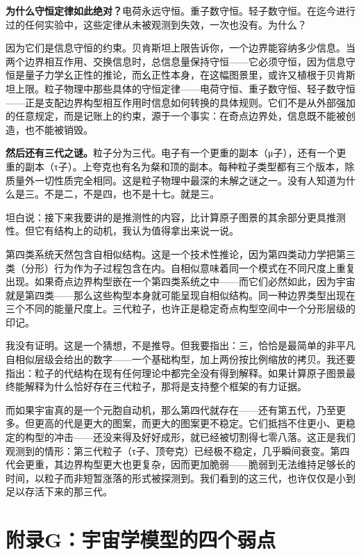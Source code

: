 \documentclass[11pt, twoside, openright]{book}
\begin{document}
\textbf{为什么守恒定律如此绝对？}电荷永远守恒。重子数守恒。轻子数守恒。在迄今进行过的任何实验中，这些定律从未被观测到失效，一次也没有。为什么？

因为它们是信息守恒的约束。贝肯斯坦上限告诉你，一个边界能容纳多少信息。当两个边界相互作用、交换信息时，总信息量保持守恒------它必须守恒，因为信息守恒是量子力学幺正性的推论，而幺正性本身，在这幅图景里，或许又植根于贝肯斯坦上限。粒子物理中那些具体的守恒定律------电荷守恒、重子数守恒、轻子数守恒------正是支配边界构型相互作用时信息如何转换的具体规则。它们不是从外部强加的任意规定，而是记账上的约束，源于一个事实：在奇点边界处，信息既不能被创造，也不能被销毁。

\textbf{然后还有三代之谜。}粒子分为三代。电子有一个更重的副本（μ子），还有一个更重的副本（τ子）。上夸克也有名为粲和顶的副本。每种粒子类型都有三个版本，除质量外一切性质完全相同。这是粒子物理中最深的未解之谜之一。没有人知道为什么是三。不是二，不是四，也不是十七。就是三。

坦白说：接下来我要讲的是推测性的内容，比计算原子图景的其余部分更具推测性。但它有结构上的动机，我认为值得拿出来说一说。

第四类系统天然包含自相似结构。这是一个技术性推论，因为第四类动力学把第三类（分形）行为作为子过程包含在内。自相似意味着同一个模式在不同尺度上重复出现。如果奇点边界构型嵌在一个第四类系统之中------而它们必然如此，因为宇宙就是第四类------那么这些构型本身就可能呈现自相似结构。同一种边界类型出现在三个不同的能量尺度上。三代粒子，也许正是稳定奇点构型空间中一个分形层级的印记。

我没有证明。这是一个猜想，不是推导。但我要指出：三，恰恰是最简单的非平凡自相似层级会给出的数字------一个基础构型，加上两份按比例缩放的拷贝。我还要指出：粒子的代结构在现有任何理论中都完全没有得到解释。如果计算原子图景最终能解释为什么恰好存在三代粒子，那将是支持整个框架的有力证据。

而如果宇宙真的是一个元胞自动机，那么第四代就存在------还有第五代，乃至更多。但更高的代是更大的图案，而更大的图案更不稳定。它们抵挡不住更小、更稳定的构型的冲击------还没来得及好好成形，就已经被切割得七零八落。这正是我们观测到的情形：第三代粒子（τ子、顶夸克）已经极不稳定，几乎瞬间衰变。第四代会更重，其边界构型更大也更复杂，因而更加脆弱------脆弱到无法维持足够长的时间，以粒子而非短暂涨落的形式被探测到。我们看到的这三代，也许仅仅是小到足以存活下来的那三代。


\chapter*{附录G：宇宙学模型的四个弱点}
\end{document}
